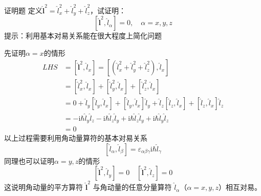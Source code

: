 \begin{question}{证明题}
    定义$\hat{\boldsymbol{l}}^2 = \hat{l}_x^2 + \hat{l}_y^2 + \hat{l}_z^2$，试证明：
    $$
        \left[\hat{\boldsymbol{l}}^2, \hat{l}_{\alpha}\right] = 0,
        \quad \alpha=x,y,z
    $$
    提示：利用基本对易关系能在很大程度上简化问题
\end{question}
\begin{solution}
    先证明$\alpha=x$的情形
    $$
        \begin{aligned}
            LHS
             & = \left[\hat{\boldsymbol{l}}^2, \hat{l}_x\right] = \left[\left(\hat{l}_x^2+\hat{l}_y^2+\hat{l}_z^2\right), \hat{l}_x\right]                                                     \\
             & = \left[\hat{l}_x^2, \hat{l}_x\right] + \left[\hat{l}_y^2, \hat{l}_x\right] + \left[\hat{l}_z^2, \hat{l}_x\right]                                                               \\
             & = 0+\hat{l}_y\left[\hat{l}_y, \hat{l}_x\right]+\left[\hat{l}_y, \hat{l}_x\right]\hat{l}_y+\hat{l}_z\left[\hat{l}_z, \hat{l}_x\right]+\left[\hat{l}_z, \hat{l}_x\right]\hat{l}_z \\
             & =-\mathrm{i}\hbar\hat{l}_y\hat{l}_z-\mathrm{i}\hbar\hat{l}_z\hat{l}_y+\mathrm{i}\hbar\hat{l}_z\hat{l}_y+\mathrm{i}\hbar\hat{l}_y\hat{l}_z                                       \\
             & =0
        \end{aligned}
    $$
    以上过程需要利用角动量算符的基本对易关系
    $$
        \left[\hat{l}_{\alpha}, \hat{l}_{\beta}\right]=\varepsilon_{\alpha\beta\gamma}\mathrm{i}\hbar\hat{l}_{\gamma}
    $$
    同理也可以证明$\alpha=y,z$的情形
    $$
        \left[\hat{\boldsymbol{l}}^2, \hat{l}_y\right] = 0
        \quad
        \left[\hat{\boldsymbol{l}}^2, \hat{l}_z\right] = 0
    $$
    这说明角动量的平方算符 $\hat{\boldsymbol{l}}^2$ 与角动量的任意分量算符 $\hat{l}_{\alpha}$（$\alpha=x, y, z$）相互对易。
\end{solution}




